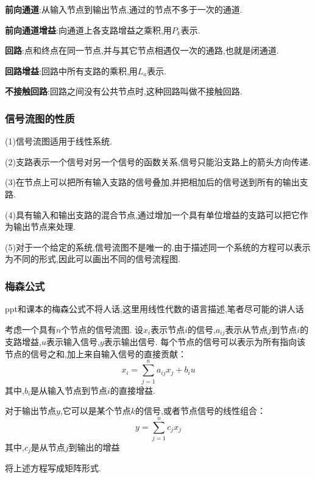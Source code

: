 \documentclass[12pt,a4paper,oneside]{ctexart}
\begin{document}
\textbf{前向通道}:从输入节点到输出节点,通过的节点不多于一次的通道.

\textbf{前向通道增益}:向通道上各支路增益之乘积,用$P_k$表示.

\textbf{回路}:点和终点在同一节点,并与其它节点相遇仅一次的通路,也就是闭通道.

\textbf{回路增益}:回路中所有支路的乘积,用$L_a$表示.

\textbf{不接触回路}:回路之间没有公共节点时,这种回路叫做不接触回路.

\subsubsection{信号流图的性质}
(1)信号流图适用于线性系统.

(2)支路表示一个信号对另一个信号的函数关系,信号只能沿支路上的箭头方向传递.

(3)在节点上可以把所有输入支路的信号叠加,并把相加后的信号送到所有的输出支路.

(4)具有输入和输出支路的混合节点,通过增加一个具有单位增益的支路可以把它作为输出节点来处理.

(5)对于一个给定的系统,信号流图不是唯一的.由于描述同一个系统的方程可以表示为不同的形式,因此可以画出不同的信号流程图.

\subsubsection{梅森公式}

ppt和课本的梅森公式不将人话,这里用线性代数的语言描述,笔者尽可能的讲人话

考虑一个具有$n$个节点的信号流图.
设$x_i$​表示节点$i$的信号,$a_{ij}$​表示从节点$j$到节点$i$的支路增益,$u$表示输入信号,$y$表示输出信号.
每个节点的信号可以表示为所有指向该节点的信号之和,加上来自输入信号的直接贡献：
\[
    x_i = \sum_{j=1}^{n}a_{ij}x_j + b_iu
\]
其中,$b_i$是从输入节点到节点$i$的直接增益.

对于输出节点$y$,它可以是某个节点$k$的信号,或者节点信号的线性组合：
\[
    y = \sum_{j=1}^{n}c_jx_j
\]
其中,$c_j$是从节点$j$到输出的增益

将上述方程写成矩阵形式.
\end{document}
